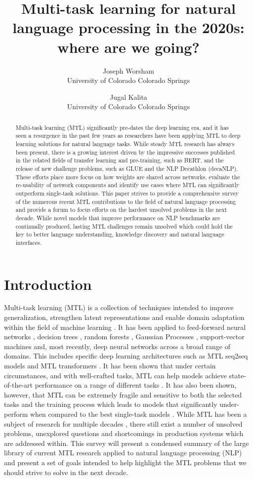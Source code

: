 \documentclass[twocolumn]{article}
\title{Multi-task learning for natural language processing in the 2020s: where are we going?}
\author{Joseph Worsham\\ University of Colorado Colorado Springs
\and Jugal Kalita\\ University of Colorado Colorado Springs}
\date{}
\begin{document}
	
\maketitle

\begin{abstract}
Multi-task learning (MTL) significantly pre-dates the deep learning era, and it has seen a resurgence in the past few years as researchers have been applying MTL to deep learning solutions for natural language tasks. While steady MTL research has always been present, there is a growing interest driven by the impressive successes published in the related fields of transfer learning and pre-training, such as BERT, and the release of new challenge problems, such as GLUE and the NLP Decathlon (decaNLP). These efforts place more focus on how weights are shared across networks, evaluate the re-usability of network components and identify use cases where MTL can significantly outperform single-task solutions. This paper strives to provide a comprehensive survey of the numerous recent MTL contributions to the field of natural language processing and provide a forum to focus efforts on the hardest unsolved problems in the next decade. While novel models that improve performance on NLP benchmarks are continually produced, lasting MTL challenges remain unsolved which could hold the key to better language understanding, knowledge discovery and natural language interfaces.
\end{abstract}

\section{Introduction}
Multi-task learning (MTL) is a collection of techniques intended to improve generalization, strengthen latent representations and enable domain adaptation within the field of machine learning \citep{mtl97}. It has been applied to feed-forward neural networks \citep{mtl97}, decision trees \citep{mtl97}, random forests \citep{mtforest08}, Gaussian Processes \citep{mtgp08}, support-vector machines \citep{mtsvm04} and, most recently, deep neural networks \citep{mtloverview17} across a broad range of domains. This includes specific deep learning architectures such as MTL seq2seq models \citep{mtlseqseq18} and MTL transformers \citep{mtdnn19}. It has been shown that under certain circumstances, and with well-crafted tasks, MTL can help models achieve state-of-the-art performance on a range of different tasks \citep{whichtask19}. It has also been shown, however, that MTL can be extremely fragile and sensitive to both the selected tasks and the training process which leads to models that significantly under-perform when compared to the best single-task models \citep{whenmtl17}. While MTL has been a subject of research for multiple decades \citep{mtloverview17}, there still exist a number of unsolved problems, unexplored questions and shortcomings in production systems which are addressed within. This survey will present a condensed summary of the large library of current MTL research applied to natural language processing (NLP) and present a set of goals intended to help highlight the MTL problems that we should strive to solve in the next decade.
\end{document}
